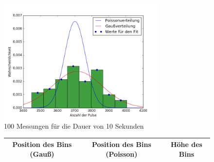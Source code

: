   
  
   \begin{figure}[h!]
   	\centering
   	\includegraphics[width=0.75\textwidth]{build/histogramm.png}
   	\caption{100 Messungen für die Dauer von 10 Sekunden}
   	\label{fig:histogramm}
   	\end{figure}
   	
   	  \begin{figure}[h!]
   	  	\centering
   	  	\begin{tabular}{c|c|c}
   	  		Position des Bins (Gauß) & Position des Bins (Poisson) & Höhe des Bins \\
   	  		\hline
   	  		
   	  	\end{tabular}
   	  	\label{tab:histogramm}
   	  \end{figure}
 



